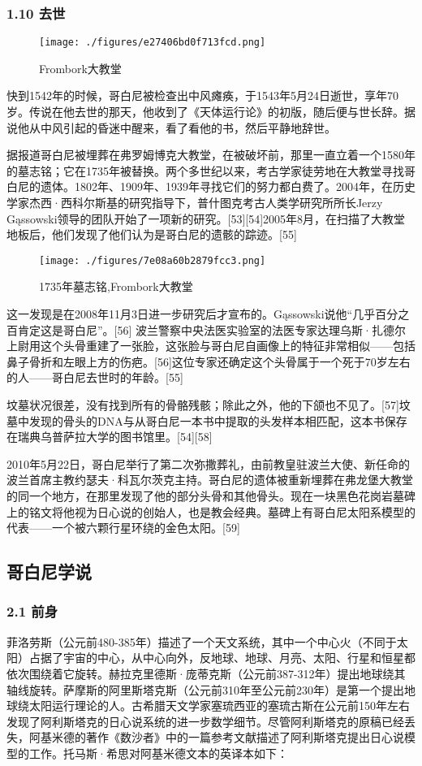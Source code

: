\subsubsection{1.10 去世}
\begin{figure}[ht]
\centering
\texttt{[image: ./figures/e27406bd0f713fcd.png]}
\caption{Frombork大教堂} \label{fig_GBN_18}
\end{figure}
快到1542年的时候，哥白尼被检查出中风瘫痪，于1543年5月24日逝世，享年70岁。传说在他去世的那天，他收到了《天体运行论》的初版，随后便与世长辞。据说他从中风引起的昏迷中醒来，看了看他的书，然后平静地辞世。

据报道哥白尼被埋葬在弗罗姆博克大教堂，在被破坏前，那里一直立着一个1580年的墓志铭；它在1735年被替换。两个多世纪以来，考古学家徒劳地在大教堂寻找哥白尼的遗体。1802年、1909年、1939年寻找它们的努力都白费了。2004年，在历史学家杰西·西科尔斯基的研究指导下，普什图克考古人类学研究所所长Jerzy Gąssowski领导的团队开始了一项新的研究。[53][54]2005年8月，在扫描了大教堂地板后，他们发现了他们认为是哥白尼的遗骸的踪迹。[55]
\begin{figure}[ht]
\centering
\texttt{[image: ./figures/7e08a60b2879fcc3.png]}
\caption{1735年墓志铭,Frombork大教堂} \label{fig_GBN_19}
\end{figure}
这一发现是在2008年11月3日进一步研究后才宣布的。Gąssowski说他“几乎百分之百肯定这是哥白尼”。[56] 波兰警察中央法医实验室的法医专家达理乌斯·扎德尔上尉用这个头骨重建了一张脸，这张脸与哥白尼自画像上的特征非常相似——包括鼻子骨折和左眼上方的伤疤。[56]这位专家还确定这个头骨属于一个死于70岁左右的人——哥白尼去世时的年龄。[55]

坟墓状况很差，没有找到所有的骨骼残骸；除此之外，他的下颌也不见了。[57]坟墓中发现的骨头的DNA与从哥白尼一本书中提取的头发样本相匹配，这本书保存在瑞典乌普萨拉大学的图书馆里。[54][58]

2010年5月22日，哥白尼举行了第二次弥撒葬礼，由前教皇驻波兰大使、新任命的波兰首席主教约瑟夫·科瓦尔茨克主持。哥白尼的遗体被重新埋葬在弗龙堡大教堂的同一个地方，在那里发现了他的部分头骨和其他骨头。现在一块黑色花岗岩墓碑上的铭文将他视为日心说的创始人，也是教会经典。墓碑上有哥白尼太阳系模型的代表——一个被六颗行星环绕的金色太阳。[59]

\subsection{哥白尼学说}
\subsubsection{2.1 前身}
菲洛劳斯（公元前480-385年）描述了一个天文系统，其中一个中心火（不同于太阳）占据了宇宙的中心，从中心向外，反地球、地球、月亮、太阳、行星和恒星都依次围绕着它旋转。赫拉克里德斯·庞蒂克斯（公元前387-312年）提出地球绕其轴线旋转。萨摩斯的阿里斯塔克斯（公元前310年至公元前230年）是第一个提出地球绕太阳运行理论的人。古希腊天文学家塞琉西亚的塞琉古斯在公元前150年左右发现了阿利斯塔克的日心说系统的进一步数学细节。尽管阿利斯塔克的原稿已经丢失，阿基米德的著作《数沙者》中的一篇参考文献描述了阿利斯塔克提出日心说模型的工作。托马斯·希思对阿基米德文本的英译本如下：

